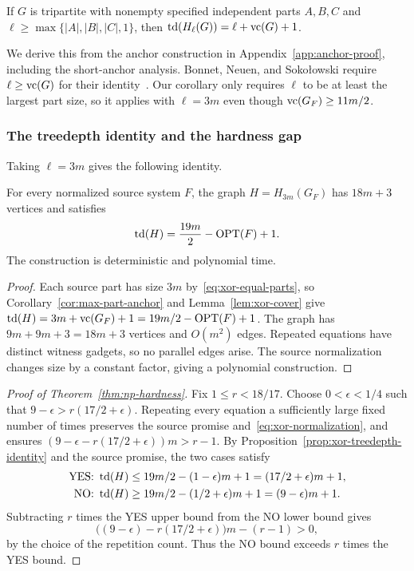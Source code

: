 \begin{corollary}\label{cor:max-part-anchor}
If $G$ is tripartite with nonempty specified independent parts $A,B,C$ and
$\ell\ge\max\{|A|,|B|,|C|,1\}$, then
$\operatorname{td}(H_\ell(G))=\ell+\operatorname{vc}(G)+1$.
\end{corollary}

We derive this from the anchor construction in Appendix~\ref{app:anchor-proof},
including the short-anchor analysis.
Bonnet, Neuen, and Soko\l owski require $\ell\geq\operatorname{vc}(G)$ for their
identity~\cite[Lemma~6]{BNS}. Our corollary only requires $\ell$ to be at
least the largest part size, so it applies with $\ell=3m$ even though
$\operatorname{vc}(G_F)\geq11m/2$.

\subsubsection{The treedepth identity and the hardness gap}

Taking $\ell=3m$ gives the following identity.

\begin{proposition}\label{prop:xor-treedepth-identity}
For every normalized source system $F$, the graph $H=H_{3m}(G_F)$
has $18m+3$ vertices and satisfies
\begin{equation}\label{eq:xor-treedepth-identity}
 \operatorname{td}(H)=\frac{19m}{2}-\operatorname{OPT}(F)+1.
\end{equation}
The construction is deterministic and polynomial time.
\end{proposition}

\begin{proof}
Each source part has size $3m$ by~\eqref{eq:xor-equal-parts}, so
Corollary~\ref{cor:max-part-anchor} and Lemma~\ref{lem:xor-cover} give
$\operatorname{td}(H)=3m+\operatorname{vc}(G_F)+1=19m/2-\operatorname{OPT}(F)+1$.
The graph has $9m+9m+3=18m+3$ vertices and $O(m^2)$ edges.
Repeated equations have distinct witness gadgets, so no parallel
edges arise. The source normalization changes size by a constant
factor, giving a polynomial construction.
\end{proof}

\begin{proof}[Proof of Theorem~\ref{thm:np-hardness}]
Fix $1\le r<18/17$. Choose $0<\epsilon<1/4$ such that
$9-\epsilon>r(17/2+\epsilon)$. Repeating every equation a sufficiently
large fixed number of times preserves the source promise
and~\eqref{eq:xor-normalization}, and ensures
$(9-\epsilon-r(17/2+\epsilon))m>r-1$.
By Proposition~\ref{prop:xor-treedepth-identity} and the source
promise, the two cases satisfy
\[
\begin{aligned}
\textup{YES: }\operatorname{td}(H)
 &\le19m/2-(1-\epsilon)m+1
   =(17/2+\epsilon)m+1,\\
\textup{NO: }\operatorname{td}(H)
 &\ge19m/2-(1/2+\epsilon)m+1
   =(9-\epsilon)m+1.
\end{aligned}
\]
Subtracting $r$ times the YES upper bound from the NO lower bound gives
\[
 \bigl((9-\epsilon)-r(17/2+\epsilon)\bigr)m-(r-1)>0,
\]
by the choice of the repetition count. Thus the NO bound exceeds $r$
times the YES bound.
\end{proof}
